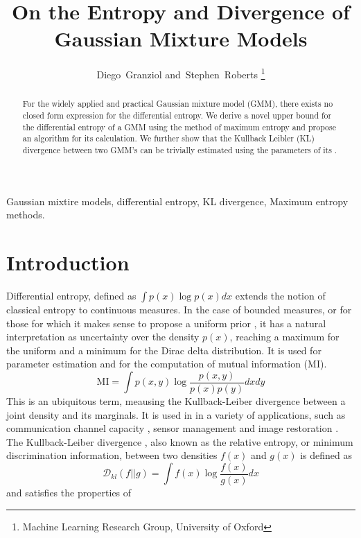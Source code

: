 \documentclass[journal]{IEEEtran}
\begin{document}
	\title{On the Entropy and Divergence of Gaussian Mixture Models}

	
	\author{Diego~Granziol and~Stephen~Roberts%
		\thanks{Machine Learning Research Group, University of Oxford}%
	}
	


	\maketitle
	
	
	\begin{abstract}
		
For the widely applied and practical Gaussian mixture model (GMM), there exists no closed form expression for the differential entropy. We derive a novel upper bound for the differential entropy of a GMM using the method of maximum entropy and propose an algorithm for its calculation. We further show that the Kullback Leibler (KL) divergence between two GMM's can be trivially estimated using the parameters of its .
		
	\end{abstract}

	\begin{IEEEkeywords}
		Gaussian mixtire models, differential entropy, KL divergence, Maximum entropy methods.
	\end{IEEEkeywords}
	

	\IEEEpeerreviewmaketitle
	\section{Introduction}
Differential entropy, defined as $\int p(x)\log p(x)dx$ \cite{cover2012elements} extends the notion of classical entropy \cite{shannon2001mathematical} to continuous measures. In the case of bounded measures, or for those for which it makes sense to propose a uniform prior \cite{caticha2012entropic}, it has a natural interpretation as uncertainty over the density $p(x)$, reaching a maximum for the uniform and a minimum for the Dirac delta distribution. It is used for parameter estimation \cite{cheng1983estimating}	and for the computation of mutual information (MI). \begin{equation}
\text{MI} = \int p(x,y)\log \frac{p(x,y)}{p(x)p(y)}dxdy
\end{equation} This is an ubiquitous term, meausing the Kullback-Leiber divergence between a joint density and its marginals. It is used in in a variety of applications, such as communication channel capacity \cite{cover2012elements}, sensor management \cite{manyika1992information} and image restoration \cite{viola1997alignment}. \newline The Kullback-Leiber divergence \cite{cover2012elements}, also known as the relative entropy, or minimum discrimination information, between two densities $f(x)$ and $g(x)$ is defined as \begin{equation}
\mathcal{D}_{kl}(f||g) = \int f(x)\log \frac{f(x)}{g(x)}dx
\end{equation}
and satisfies the properties of
\end{document}
